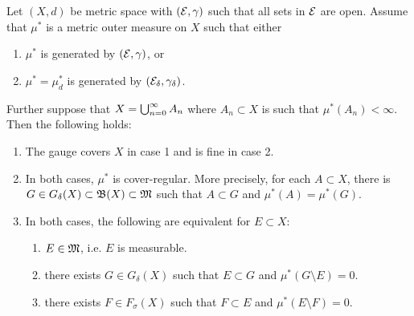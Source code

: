 \documentclass[a4paper]{article}
\begin{document}
\begin{thm}
  Let $(X, d)$ be metric space with $(\mathcal{E}, \gamma)$ such that
  all sets in $\mathcal{E}$ are open. Assume that $\mu^*$ is a metric
  outer measure on $X$ such that either

  \begin{enumerate}
    \item $\mu^*$ is generated by $(\mathcal{E}, \gamma)$, or
    \item $\mu^* = \mu^*_d$ is generated by $(\mathcal{E}_\delta,
    \gamma_\delta)$.
  \end{enumerate}

  Further suppose that $X = \bigcup_{n=0}^\infty A_n$ where $A_n \subset X$
  is such that $\mu^*(A_n) < \infty$. Then the following holds:

  \begin{enumerate}
    \item The gauge covers $X$ in case 1 and is fine in case
    2.
    \item In both cases, $\mu^*$ is cover-regular. More precisely,
    for each $A \subset X$, there is $G \in G_\delta(X) \subset \mathfrak{B}(X)
    \subset \mathfrak{M}$ such that $A \subset G$ and $\mu^*(A) = \mu^*(G)$.
    \item In both cases, the following are equivalent for
    $E \subset X$:
    \begin{enumerate}
      \item $E \in \mathfrak{M}$, i.e. $E$ is measurable.
      \item there exists $G \in G_\delta(X)$ such that
      $E \subset G$ and $\mu^*(G \setminus E) = 0$.
      \item there exists $F \in F_\sigma(X)$ such that
      $F \subset E$ and $\mu^* (E \setminus F) = 0$.
    \end{enumerate}
  \end{enumerate}
\end{thm}
\end{document}

